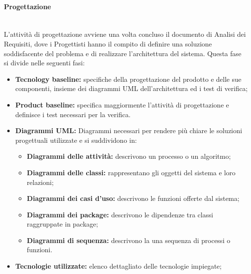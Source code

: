 			\paragraph {Progettazione \\ \\}
				L'attività di progettazione avviene una volta concluso il documento di Analisi dei Requisiti, dove i Progettisti hanno il compito di definire una soluzione soddisfacente del problema e di realizzare l'architettura del sistema.
				Questa fase si divide nelle seguenti fasi: 
				\begin{itemize}
					\item \textbf{Tecnology baseline:} specifiche della progettazione del prodotto e delle sue componenti, insieme dei diagrammi UML dell'architettura ed i test di verifica;
					\item \textbf{Product baseline:} specifica maggiormente l'attività di progettazione e definisce i test necessari per la verifica. 
					\item \textbf{Diagrammi UML:} Diagrammi necessari per rendere più chiare le soluzioni progettuali utilizzate e si suddividono in:	
					\begin{itemize}
						\item \textbf{Diagrammi delle attività:} descrivono un processo o un algoritmo;
						\item \textbf{Diagrammi delle classi:} rappresentano gli oggetti del sistema e loro relazioni;
						\item \textbf{Diagrammi dei casi d'uso:} descrivono le funzioni offerte dal sistema;
						\item \textbf{Diagrammi dei package:} descrivono le dipendenze tra classi raggruppate in package;
						\item \textbf{Diagrammi di sequenza:} descrivono la una sequenza di processi o funzioni.
					\end{itemize}
					\item \textbf{Tecnologie utilizzate:} elenco dettagliato delle tecnologie impiegate; 
					\end{itemize}	
				

